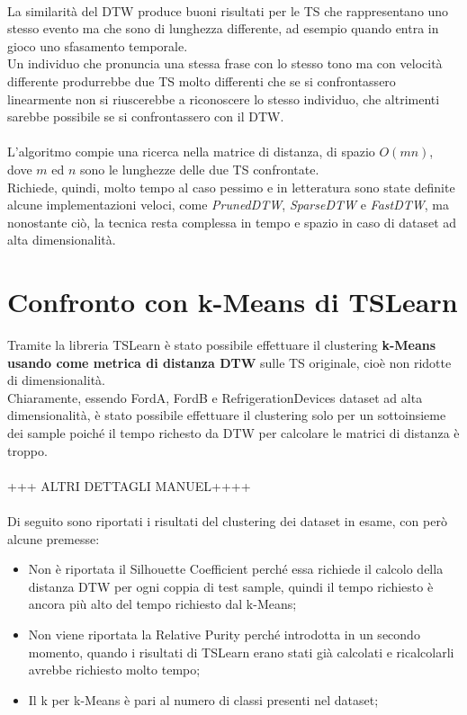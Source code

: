 \\
La similarità del DTW produce buoni risultati per le TS che rappresentano uno stesso evento ma che sono di lunghezza differente, ad esempio quando entra in gioco uno sfasamento temporale.\\
Un individuo che pronuncia una stessa frase con lo stesso tono ma con velocità differente produrrebbe due TS molto differenti che se si confrontassero linearmente non si riuscerebbe a riconoscere lo stesso individuo, che altrimenti sarebbe possibile se si confrontassero con il DTW.\\
\\
L'algoritmo compie una ricerca nella matrice di distanza, di spazio $O(mn)$, dove $m$ ed $n$ sono le lunghezze delle due TS confrontate.\\
Richiede, quindi, molto tempo al caso pessimo e in letteratura sono state definite alcune implementazioni veloci, come \textit{PrunedDTW}, \textit{SparseDTW} e \textit{FastDTW}, ma nonostante ciò, la tecnica resta complessa in tempo e spazio in caso di dataset ad alta dimensionalità.\\

\section{Confronto con k-Means di TSLearn}
Tramite la libreria TSLearn è stato possibile effettuare il clustering \textbf{k-Means usando come metrica di distanza DTW} sulle TS originale, cioè non ridotte di dimensionalità.\\
Chiaramente, essendo FordA, FordB e RefrigerationDevices dataset ad alta dimensionalità, è stato possibile effettuare il clustering solo per un sottoinsieme dei sample poiché il tempo richesto da DTW per calcolare le matrici di distanza è troppo.\\
\\
+++ ALTRI DETTAGLI MANUEL++++\\
\\
Di seguito sono riportati i risultati del clustering dei dataset in esame, con però alcune premesse:
\begin{itemize}
	\item Non è riportata il Silhouette Coefficient perché essa richiede il calcolo della distanza DTW per ogni coppia di test sample, quindi il tempo richiesto è ancora più alto del tempo richiesto dal k-Means;
	\item Non viene riportata la Relative Purity perché introdotta in un secondo momento, quando i risultati di TSLearn erano stati già calcolati e ricalcolarli avrebbe richiesto molto tempo;
	\item Il k per k-Means è pari al numero di classi presenti nel dataset;
\end{itemize}

